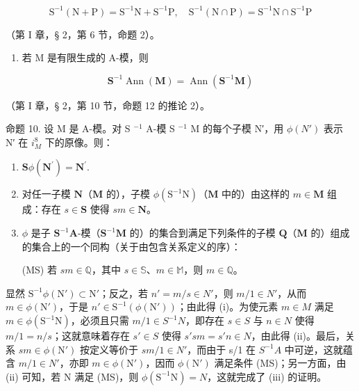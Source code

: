 \[
\mathrm{S} ^ {- 1} (\mathrm{N} + \mathrm{P}) = \mathrm{S} ^ {- 1} \mathrm{N} + \mathrm{S} ^ {- 1} \mathrm{P}, \quad \mathrm{S} ^ {- 1} (\mathrm{N} \cap \mathrm{P}) = \mathrm{S} ^ {- 1} \mathrm{N} \cap \mathrm{S} ^ {- 1} \mathrm{P}
\]

（第 I 章，§ 2，第 6 节，命题 2）。

\begin{enumerate}
\def\labelenumi{(\arabic{enumi})}
\setcounter{enumi}{1}
\tightlist
\item
  若 M 是有限生成的 A-模，则
\end{enumerate}

\[
\mathbf {S} ^ {- 1} \operatorname{Ann} (\mathbf {M}) = \operatorname{Ann} (\mathbf {S} ^ {- 1} \mathbf {M})\tag{9}
\]

（第 I 章，§ 2，第 10 节，命题 12 的推论 2）。

命题 10. 设 M 是 A-模。对 S \(^{-1}\) A-模 S \(^{-1}\) M 的每个子模 N′，用 \(\phi(N')\) 表示 N′ 在 \(i_{M}^{8}\) 下的原像。则：

\begin{enumerate}
\def\labelenumi{(\roman{enumi})}
\item
  \(\mathbf{S}\phi(\mathbf{N}^{\prime}) = \mathbf{N}^{\prime}.\)
\item
  对任一子模 \(\mathbf{N}\)（\(\mathbf{M}\) 的），子模 \(\phi (\mathrm{S}^{-1}\mathrm{N})\)（\(\mathbf{M}\) 中的）由这样的 \(m\in \mathbf{M}\) 组成：存在 \(s\in \mathbf{S}\) 使得 \(sm\in \mathbf{N}\)。
\item
  \(\phi\) 是子 \(\mathbf{S}^{-1}\mathbf{A}\)-模（\(\mathbf{S}^{-1}\mathbf{M}\) 的）的集合到满足下列条件的子模 \(\mathbf{Q}\)（\(\mathbf{M}\) 的）组成的集合上的一个同构（关于由包含关系定义的序）：

(MS) 若 \(sm \in \mathbb{Q}\)，其中 \(s \in \mathbb{S}\)、\(m \in \mathbb{M}\)，则 \(m \in \mathbb{Q}\)。

\end{enumerate}
显然 \(\mathrm{S}^{-1}\phi(\mathrm{N}')\subset\mathrm{N}'\)；反之，若 \(n' = m/s \in N'\)，则 \(m/1 \in N'\)，从而 \(m \in \phi(\mathrm{N}')\)，于是 \(n' \in \mathrm{S}^{-1}(\phi(\mathrm{N'}))\)；由此得 (i)。为使元素 \(m \in M\) 满足 \(m \in \phi(\mathrm{S}^{-1}\mathrm{N})\)，必须且只需 \(m/1 \in S^{-1}N\)，即存在 \(s \in S\) 与 \(n \in N\) 使得 \(m/1 = n/s\)；这就意味着存在 \(s' \in S\) 使得 \(s'sm = s'n \in N\)，由此得 (ii)。最后，关系 \(sm \in \phi(\mathrm{N}')\) 按定义等价于 \(sm/1 \in N'\)，而由于 s/1 在 \(S^{-1}A\) 中可逆，这就蕴含 \(m/1 \in N'\)，亦即 \(m \in \phi(\mathrm{N}')\)，因而 \(\phi(\mathrm{N}')\) 满足条件 (MS)；另一方面，由 (ii) 可知，若 N 满足 (MS)，则 \(\phi(\mathrm{S}^{-1}\mathrm{N}) = N\)，这就完成了 (iii) 的证明。

